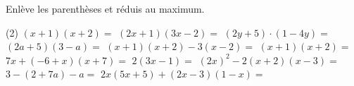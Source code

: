 %
%
Enlève les parenthèses et réduis au maximum.
  \begin{tasks}(2)
    \task $\left(x+1\right)\left(x+2\right)=$
    \task $\left(2x+1\right)\left(3x-2\right)=$
    \task $\left(2y+5\right)\cdot\left(1-4y\right)=$
    \task $\left(2a+5\right)\left(3-a\right)=$
    \task $\left(x+1\right)\left(x+2\right)-3\left(x-2\right)=$
    \task $\left(x+1\right)\left(x+2\right)=$
    \task $7x+\left(-6+x\right)\left(x+7\right)=$
    \task $2\left(3x-1\right)=$
    \task $\left(2x\right)^2-2\left(x+2\right)\left(x-3\right)=$
    \task $3-\left(2+7a\right)-a=$
    \task $2x\left(5x+5\right)+\left(2x-3\right)\left(1-x\right)=$
  \end{tasks}
